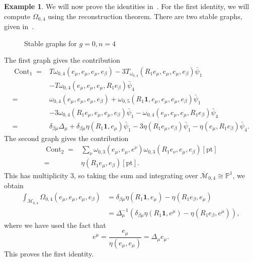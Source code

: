 \documentclass[10pt,oldfontcommands,oneside]{memoir}
\theoremstyle{definition}
\newtheorem{exm}[thm]{Example}
\theoremstyle{remark}
\theoremstyle{plain}
\theoremstyle{definition}
\theoremstyle{remark}
\renewcommand{\P}{\mathbb{P}}
\newcommand{\Mbar}{\overline{\mathcal{M}}}
\newcommand{\mr}[1]{\mathrm{#1}}
\newcommand{\1}{\mathbf{1}}
\newcommand{\2}{\mathbf{2}}
\newcommand{\3}{\mathbf{3}}
\newcommand{\pt}{\mr{pt}}
\DeclareMathOperator{\Cont}{Cont}
\begin{document}
\begin{exm}
    We will now prove the identities in~. For the first identity, we will compute $\Omega_{0,4}$ using the reconstruction theorem. There are two stable graphs, given in~.
    \begin{figure}[htpb]
    \begin{center}
    \end{center}
    \caption{Stable graphs for $g=0, n=4$}%
    \label{fig:04graphs}
    \end{figure}
The first graph gives the contribution
\begin{align*}
    \Cont_1 ={}& T \omega_{0,4}(e_{\mu}, e_{\mu}, e_{\mu}, e_{\beta}) - 3 T_{\omega_{0,4}}(R_1 e_{\mu}, e_{\mu}, e_{\mu}, e_{\beta}) \bar{\psi}_1 \\ 
    &- T \omega_{0,4}(e_{\mu}, e_{\mu}, e_{\mu}, R_1 e_{\beta}) \bar{\psi}_4 \\
    ={}& \omega_{0,4}(e_{\mu}, e_{\mu}, e_{\mu}, e_{\beta}) + \omega_{0,5}(R_1 \1, e_{\mu}, e_{\mu}, e_{\mu}, e_{\beta}) \bar{\psi}_1 \\
    &- 3 \omega_{0,4}(R_1 e_{\mu}, e_{\mu}, e_{\mu}, e_{\beta}) \bar{\psi}_1 - \omega_{0,4}(e_{\mu}, e_{\mu}, e_{\mu}, R_1 e_{\beta}) \bar{\psi}_4 \\
    ={}& \delta_{\beta\mu} \Delta_{\mu} + \delta_{\beta\mu} \eta(R_1 \1, e_{\mu}) \bar{\psi}_1 - 3 \eta (R_1 e_{\mu}, e_{\beta}) \bar{\psi}_1 - \eta(e_{\mu}, R_1 e_{\beta}) \bar{\psi}_4.
\end{align*}
The second graph gives the contribution
\begin{align*}
    \Cont_2 ={}& \sum_{\nu} \omega_{0,3}(e_{\mu}, e_{\mu}, e^{\nu}) \omega_{0,3}(R_1 e_{\nu}, e_{\mu}, e_{\beta}) [\pt] \\
    ={}& \eta(R_1 e_{\mu},e_{\beta}) [\pt].
\end{align*}
This has multiplicity $3$, so taking the sum and integrating over $\Mbar_{0,4} \cong \P^1$, we obtain
\begin{align*}
    \int_{\Mbar_{0,4}} \Omega_{0,4}(e_{\mu}, e_{\mu}, e_{\mu}, e_{\beta}) &= \delta_{\beta\mu} \eta(R_1 \1, e_{\mu}) - \eta(R_1 e_{\beta}, e_{\mu}) \\
    &= \Delta_{\mu}^{-1} (\delta_{\beta\mu} \eta(R_1 \1, e^{\mu}) - \eta(R_1 e_{\beta}, e^{\mu})),
\end{align*}
where we have used the fact that
\[ e^{\mu} = \frac{e_{\mu}}{\eta(e_{\mu}, e_{\mu})} = \Delta_{\mu} e_{\mu}. \]
This proves the first identity.


\end{exm}
\end{document}
